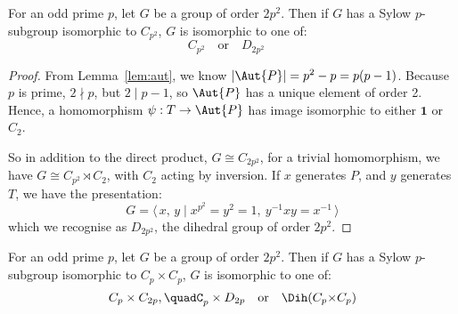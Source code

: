 \begin{lemma}
    For an odd prime \(p\), let \(G\) be a group of order \(2p^2\). Then if \(G\) has a Sylow \(p\)-subgroup isomorphic
    to \(C_{p^2}\), \(G\) is isomorphic to one of:
    \[%
        C_{p^2} \quad \text{or} \quad%
        D_{2p^2} \quad%
    \]
\end{lemma}

\begin{proof}
        From Lemma~\ref{lem:aut}, we know \(|\Aut{P}| = p^2 - p = p(p-1)\).
        Because \(p\) is prime, \(2 \nmid p\), but \( 2 \mid p - 1\), so \(\Aut{P}\) has a unique element of order 2.
        Hence, a homomorphism \(\psi:T \to \Aut{P}\) has image isomorphic to either \(\bm{1}\) or \(C_{2}\).

        So in addition to the direct product, \(G \cong C_{2p^2}\), for a trivial homomorphism, we have \(G \cong
        C_{p^2} \rtimes C_2\), with \(C_2\) acting by inversion.
        If \(x\) generates \(P\), and \(y\) generates \(T\), we have the presentation:
        \[G = \langle\, x,\,y \mid x^{p^2} = y^2 = 1,\ y^{-1}xy = x^{-1}\,\rangle\]
        which we recognise as \(D_{2p^2}\), the dihedral group of order \(2p^2\).
\end{proof}

\begin{lemma}
    For an odd prime \(p\), let \(G\) be a group of order \(2p^2\). Then if \(G\) has a Sylow \(p\)-subgroup isomorphic
    to \(C_p \times C_{p}\), \(G\) is isomorphic to one of:
    \[%
        C_p \times C_{2p}, \quad%
        C_p \times D_{2p} \quad \text{or} \quad%
        \Dih(C_p {\times} C_p)
    \]
\end{lemma}

